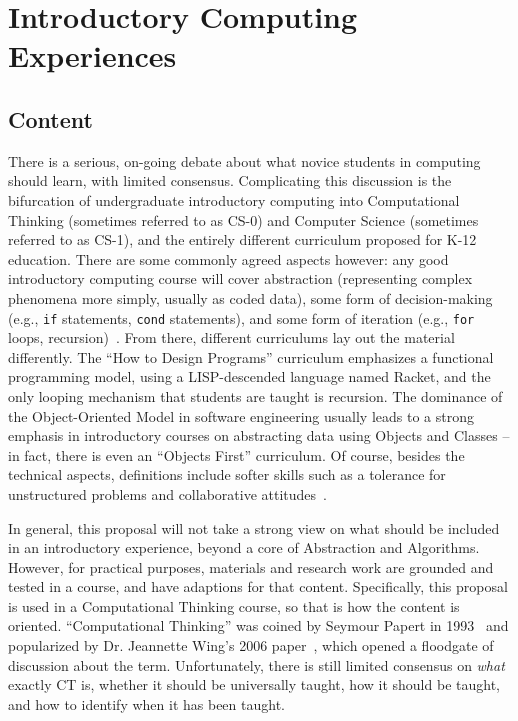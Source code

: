 \section{Introductory Computing Experiences}



\subsection{Content}

There is a serious, on-going debate about what novice students in computing should learn, with limited consensus. 
Complicating this discussion is the bifurcation of undergraduate introductory computing into Computational Thinking (sometimes referred to as CS-0) and Computer Science (sometimes referred to as CS-1), and the entirely different curriculum proposed for K-12 education.
There are some commonly agreed aspects however: any good introductory computing course will cover abstraction (representing complex phenomena more simply, usually as coded data), some form of decision-making (e.g., \texttt{if} statements, \texttt{cond} statements), and some form of iteration (e.g., \texttt{for} loops, recursion)~\cite{Kramer:2007, CS2013, csta-computational-thinking}.
From there, different curriculums lay out the material differently.
The ``How to Design Programs'' curriculum emphasizes a functional programming model, using a LISP-descended language named Racket, and the only looping mechanism that students are taught is recursion.
The dominance of the Object-Oriented Model in software engineering usually leads to a strong emphasis in introductory courses on abstracting data using Objects and Classes -- in fact, there is even an ``Objects First'' curriculum.
Of course, besides the technical aspects, definitions include softer skills such as a tolerance for unstructured problems and collaborative attitudes~\cite{csta-computational-thinking, google-computational-thinking}.

In general, this proposal will not take a strong view on what should be included in an introductory experience, beyond a core of Abstraction and Algorithms.
However, for practical purposes, materials and research work are grounded and tested in a course, and have adaptions for that content.
Specifically, this proposal is used in a Computational Thinking course, so that is how the content is oriented.
``Computational Thinking'' was coined by Seymour Papert in 1993~\cite{papert1996} and popularized by Dr. Jeannette Wing's 2006 paper~\cite{wing2006}, which opened a floodgate of discussion about the term. 
Unfortunately, there is still limited consensus on \textit{what} exactly CT is, whether it should be universally taught, how it should be taught, and how to identify when it has been taught.

